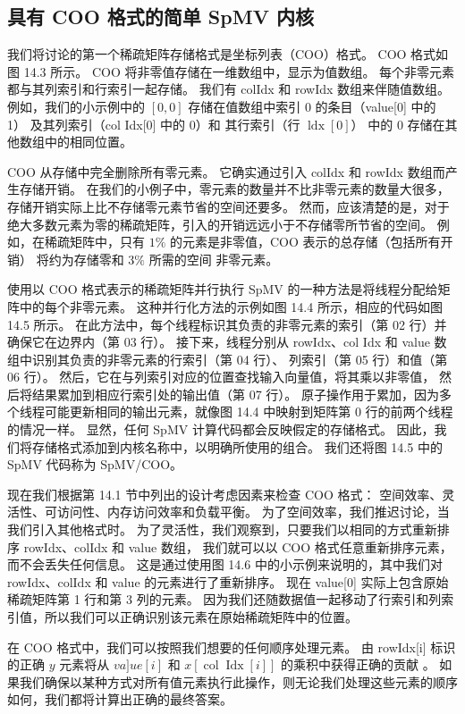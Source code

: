 \subsection{具有 COO 格式的简单 SpMV 内核}
我们将讨论的第一个稀疏矩阵存储格式是坐标列表（COO）格式。 COO 格式如图 14.3 所示。 
COO 将非零值存储在一维数组中，显示为值数组。 每个非零元素都与其列索引和行索引一起存储。 
我们有 colIdx 和 rowIdx 数组来伴随值数组。 
例如，我们的小示例中的 $[0,0]$ 存储在值数组中索引 0 的条目（value[0] 中的 1）
及其列索引（col Idx[0] 中的 0）和 其行索引（行 $\operatorname{ldx}[0]）$ 中的 0 存储在其他数组中的相同位置。

COO 从存储中完全删除所有零元素。 它确实通过引入 colIdx 和 rowIdx 数组而产生存储开销。 
在我们的小例子中，零元素的数量并不比非零元素的数量大很多，存储开销实际上比不存储零元素节省的空间还要多。 
然而，应该清楚的是，对于绝大多数元素为零的稀疏矩阵，引入的开销远远小于不存储零所节省的空间。 
例如，在稀疏矩阵中，只有 $1 \%$ 的元素是非零值，COO 表示的总存储（包括所有开销）
将约为存储零和 $3 \%$ 所需的空间 非零元素。

使用以 COO 格式表示的稀疏矩阵并行执行 SpMV 的一种方法是将线程分配给矩阵中的每个非零元素。 
这种并行化方法的示例如图 14.4 所示，相应的代码如图 14.5 所示。 
在此方法中，每个线程标识其负责的非零元素的索引（第 02 行）并确保它在边界内（第 03 行）。 
接下来，线程分别从 rowIdx、col Idx 和 value 数组中识别其负责的非零元素的行索引（第 04 行）、
列索引（第 05 行）和值（第 06 行）。 然后，它在与列索引对应的位置查找输入向量值，将其乘以非零值，
然后将结果累加到相应行索引处的输出值（第 07 行）。 
原子操作用于累加，因为多个线程可能更新相同的输出元素，就像图 14.4 中映射到矩阵第 0 行的前两个线程的情况一样。 
显然，任何 SpMV 计算代码都会反映假定的存储格式。 因此，我们将存储格式添加到内核名称中，以明确所使用的组合。 
我们还将图 14.5 中的 SpMV 代码称为 SpMV/COO。

现在我们根据第 14.1 节中列出的设计考虑因素来检查 $\mathrm{COO}$ 格式：
空间效率、灵活性、可访问性、内存访问效率和负载平衡。 为了空间效率，我们推迟讨论，当我们引入其他格式时。 
为了灵活性，我们观察到，只要我们以相同的方式重新排序 rowIdx、colIdx 和 value 数组，
我们就可以以 $\mathrm{COO}$ 格式任意重新排序元素，而不会丢失任何信息。 
这是通过使用图 14.6 中的小示例来说明的，其中我们对 rowIdx、colIdx 和 value 的元素进行了重新排序。 
现在 value[0] 实际上包含原始稀疏矩阵第 1 行和第 3 列的元素。 
因为我们还随数据值一起移动了行索引和列索引值，所以我们可以正确识别该元素在原始稀疏矩阵中的位置。

在 COO 格式中，我们可以按照我们想要的任何顺序处理元素。 
由 rowIdx[i] 标识的正确 $y$ 元素将从 $v a] u e[i]$ 
和 $x[\operatorname{col} \operatorname{Idx}[i]]$ 的乘积中获得正确的贡献 。 
如果我们确保以某种方式对所有值元素执行此操作，则无论我们处理这些元素的顺序如何，我们都将计算出正确的最终答案。

